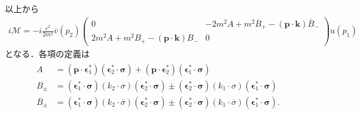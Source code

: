 以上から
\begin{align}
  i\mathcal{M}= -i\frac{e^2}{2m^4} \overline{v}(p_2)
  \begin{pmatrix}
    0 & -2m^2A + m^2\overline{B}_+ - (\boldsymbol{p}\cdot\boldsymbol{k}) \overline{B}_- \\
    2m^2A + m^2B_+ - (\boldsymbol{p}\cdot\boldsymbol{k}) B_- & 0
  \end{pmatrix}
  u(p_1) \label{prob5_4b_iM_AB}
\end{align}
となる．各項の定義は
\begin{align}
  \begin{split}
    A &= (\boldsymbol{p} \cdot \boldsymbol{\epsilon}_1^\ast)(\boldsymbol{\epsilon}_2^\ast \cdot \boldsymbol\sigma)
    + (\boldsymbol{p} \cdot \boldsymbol{\epsilon}_2^\ast)(\boldsymbol{\epsilon}_1^\ast \cdot \boldsymbol\sigma) \\
    B_\pm &= (\boldsymbol{\epsilon}_1^\ast \cdot \boldsymbol\sigma)(k_2 \cdot \sigma)(\boldsymbol{\epsilon}_2^\ast \cdot \boldsymbol\sigma)
    \pm (\boldsymbol{\epsilon}_2^\ast \cdot \boldsymbol\sigma)(k_1 \cdot \sigma)(\boldsymbol{\epsilon}_1^\ast \cdot \boldsymbol\sigma) \\
    \overline{B}_\pm &= (\boldsymbol{\epsilon}_1^\ast \cdot \boldsymbol\sigma)(k_2 \cdot \overline\sigma)(\boldsymbol{\epsilon}_2^\ast \cdot \boldsymbol\sigma)
    \pm (\boldsymbol{\epsilon}_2^\ast \cdot \boldsymbol\sigma)(k_1 \cdot \overline\sigma)(\boldsymbol{\epsilon}_1^\ast \cdot \boldsymbol\sigma)
    .
  \end{split}
  \label{prob5_4b_AB_def}
\end{align}


